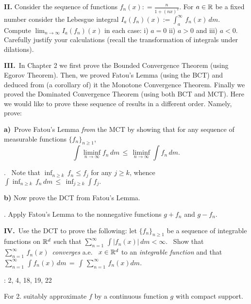 {{\bf II.} Consider the sequence of functions $f_n(x): = \frac{n}{1 +  (n x)^2}$.  For $a \in \Bbb R$ be a fixed number consider the Lebesgue integral $I_a(f_n)(x) := \int_a^\infty \, f_n(x)  \, dm$. Compute $\lim_{n \to \infty} I_a(f_n)(x)$ in each case: i) $a =0$  ii) $a > 0$  and iii) $a <0$. Carefully justify your calculations (recall the transformation of integrals under dilations). 
\bigskip

{\bf III.\,} In Chapter 2 we first prove the {Bounded Convergence Theorem} (using Egorov Theorem).
Then, we proved Fatou's Lemma (using the BCT) and
deduced from (a corollary of) it the Monotone Convergence Theorem. Finally we proved the Dominated 
Convergence Theorem (using both BCT and MCT). Here we would like to prove these sequence of results in a different order.
Namely, prove:

{\bf a)}\,  Prove Fatou's Lemma {\it from} the MCT by showing
that for any sequence of measurable functions $\{f_n\}_{n \geq 1}$, 
$$  \int  \liminf_{ n\to \infty}  f_n  \, dm \,  \leq  \,  \liminf_{ n\to \infty} \int f_n \, dm . $$

. \, Note that   $\inf_{ n \geq k} \,  f_n \leq f_j$ for any $ j \geq k$, whence  $\int \inf_{ n \geq k} \, f_n \, dm\,  \leq \, \inf_{j \geq k} \int  f_j.$ 
\medskip

{\bf b)}  Now prove the DCT  from Fatou's Lemma. 

\smallskip

. Apply Fatou's Lemma to the nonnegative functions $g + f_n$ and  $g - f_n$.

\bigskip

{\bf IV.\,}   Use the DCT to prove the following:   let $\{f_n\}_{n \ge 1}$ be a sequence of integrable functions on $\Bbb R^d$ such that $\sum_{n=1}^{\infty}\,  \int  |f_n(x)| \, dm < \infty$.  \, Show that   $\sum_{n=1}^{\infty}\,  f_n(x) \,$ {\it converges} a.e. \, $x \in \Bbb R^d$ to an {\it integrable function} and that  $\sum_{n=1}^{\infty}\,  \int  f_n(x) \, dm \, = \,  \int \, \sum_{n=1}^{\infty}\,  f_n(x) dm $.



\bigskip



\endhead

\bigskip

:  2, 4, 18, 19, 22

\smallskip

 For 2. suitably approximate $f$ by a continuous function $g$ with compact support.


}
